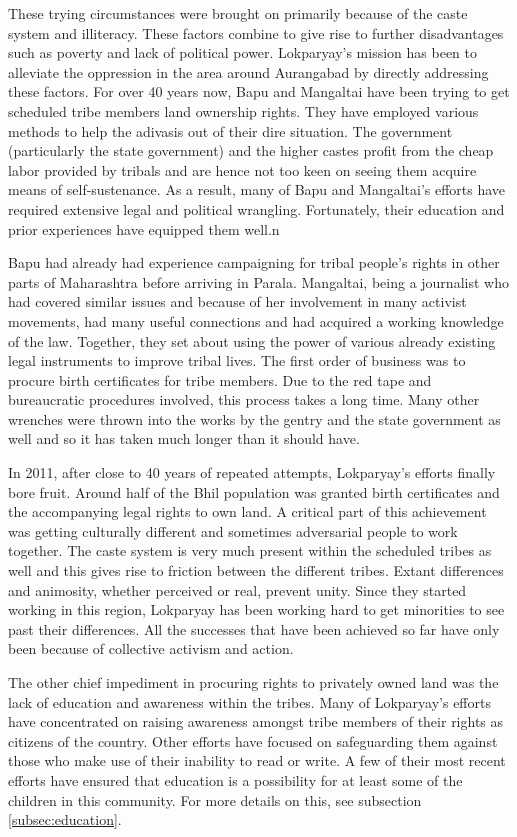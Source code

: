 \documentclass[report.tex]{subfiles}
\begin{document}
These trying circumstances were brought on primarily because of the caste system and illiteracy. These factors combine to give rise to further disadvantages such as poverty and lack of political power. Lokparyay's mission has been to alleviate the oppression in the area around Aurangabad by directly addressing these factors. For over 40 years now, Bapu and Mangaltai have been trying to get scheduled tribe members land ownership rights. They have employed various methods to help the adivasis out of their dire situation. The government (particularly the state government) and the higher castes profit from the cheap labor provided by tribals and are hence not too keen on seeing them acquire means of self-sustenance. As a result, many of Bapu and Mangaltai's efforts have required extensive legal and political wrangling. Fortunately, their education and prior experiences have equipped them well.n

Bapu had already had experience campaigning for tribal people's rights in other parts of Maharashtra before arriving in Parala. Mangaltai, being a journalist who had covered similar issues and because of her involvement in many activist movements, had many useful connections and had acquired a working knowledge of the law. Together, they set about using the power of various already existing legal instruments to improve tribal lives. The first order of business was to procure birth certificates for tribe members. Due to the red tape and bureaucratic procedures involved, this process takes a long time. Many other wrenches were thrown into the works by the gentry and the state government as well and so it has taken much longer than it should have.

In 2011, after close to 40 years of repeated attempts, Lokparyay's efforts finally bore fruit. Around half of the Bhil population was granted birth certificates and the accompanying legal rights to own land. A critical part of this achievement was getting culturally different and sometimes adversarial people to work together. The caste system is very much present within the scheduled tribes as well and this gives rise to friction between the different tribes. Extant differences and animosity, whether perceived or real, prevent unity. Since they started working in this region, Lokparyay has been working hard to get minorities to see past their differences. All the successes that have been achieved so far have only been because of collective activism and action.

The other chief impediment in procuring rights to privately owned land was the lack of education and awareness within the tribes. Many of Lokparyay's efforts have concentrated on raising awareness amongst tribe members of their rights as citizens of the country. Other efforts have focused on safeguarding them against those who make use of their inability to read or write. A few of their most recent efforts have ensured that education is a possibility for at least some of the children in this community. For more details on this, see subsection \ref{subsec:education}.
\end{document}
